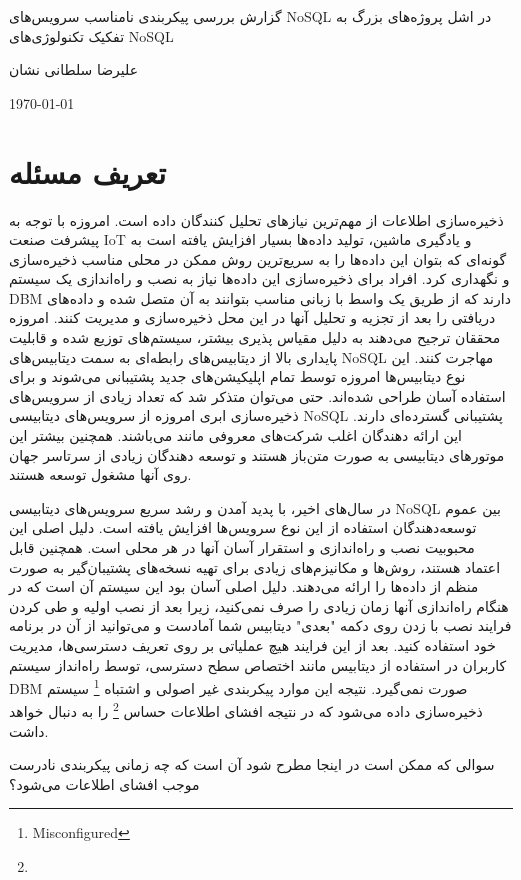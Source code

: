 \documentclass[10pt, a4paper]{article}
\begin{document}
\centerline{گزارش بررسی پیکربندی نامناسب سرویس‌های NoSQL در اشل پروژه‌های بزرگ
به تفکیک تکنولوژی‌های NoSQL}
\centerline{علیرضا سلطانی نشان}
\centerline{\today}
\tableofcontents

\newpage

\section{تعریف مسئله}

ذخیره‌سازی اطلاعات از مهم‌ترین نیاز‌های تحلیل کنندگان داده است. امروزه با توجه
به پیشرفت صنعت IoT و یادگیری ماشین، تولید داده‌ها بسیار افزایش یافته است به
گونه‌ای که بتوان این داده‌ها را به سریع‌ترین روش ممکن در محلی مناسب ذخیره‌سازی و
نگهداری کرد.  افراد برای ذخیره‌سازی این داده‌ها نیاز به نصب و راه‌اندازی یک
سیستم DBM دارند که از طریق یک واسط با زبانی مناسب بتوانند به آن متصل شده و
داده‌های دریافتی را بعد از تجزیه و تحلیل آنها در این محل ذخیره‌سازی و مدیریت
کنند. امروزه محققان ترجیح می‌دهند به دلیل مقیاس پذیری بیشتر، سیستم‌های توزیع شده
و قابلیت پایداری بالا از دیتابیس‌های رابطه‌ای به سمت دیتابیس‌های NoSQL مهاجرت
کنند.  این نوع دیتابیس‌ها امروزه توسط تمام اپلیکیشن‌های جدید پشتیبانی می‌شوند و
برای استفاده آسان طراحی شده‌اند. حتی می‌توان متذکر شد که تعداد زیادی از
سرویس‌های ذخیره‌سازی ابری امروزه‌ از سرویس‌های دیتابیسی NoSQL پشتیبانی گسترده‌ای
دارند. این ارائه دهندگان اغلب شرکت‌های معروفی مانند 
  می‌باشند. همچنین بیشتر این
موتور‌های دیتابیسی به صورت متن‌باز هستند و توسعه دهندگان زیادی از سرتاسر جهان
روی آنها مشغول توسعه هستند.

در سال‌های اخیر، با پدید آمدن و رشد سریع سرویس‌های دیتابیسی NoSQL بین عموم
توسعه‌دهندگان استفاده از این نوع سرویس‌ها افزایش یافته است. دلیل اصلی این
محبوبیت نصب و راه‌اندازی و استقرار آسان آنها در هر محلی است. همچنین قابل اعتماد
هستند، روش‌ها و مکانیزم‌های زیادی برای تهیه نسخه‌های پشتیبان‌گیر به صورت منظم از
داده‌ها را ارائه می‌دهند. دلیل اصلی آسان بود این سیستم آن است که در هنگام
راه‌اندازی آنها زمان زیادی را صرف نمی‌کنید، زیرا بعد از نصب اولیه و طی کردن
فرایند نصب با زدن روی دکمه "بعدی" دیتابیس شما آمادست و می‌توانید از آن در برنامه
خود استفاده کنید. بعد از این فرایند هیچ عملیاتی بر روی تعریف دسترسی‌ها، مدیریت
کاربران در استفاده از دیتابیس مانند اختصاص سطح دسترسی، توسط راه‌انداز سیستم DBM
صورت نمی‌گیرد. نتیجه این موارد پیکربندی غیر اصولی و اشتباه
\footnote{Misconfigured} سیستم ذخیره‌سازی داده می‌شود که در نتیجه افشای اطلاعات
حساس \footnote{} را به دنبال خواهد داشت.

سوالی که ممکن است در اینجا مطرح شود آن است که چه زمانی پیکربندی نادرست موجب
افشای اطلاعات می‌شود؟
\end{document}
